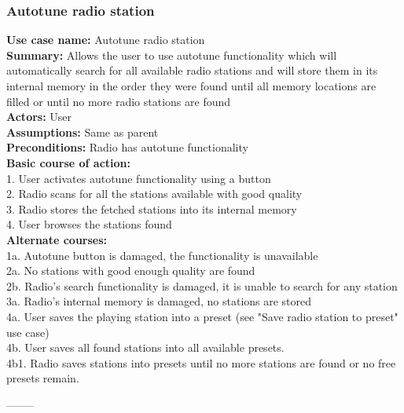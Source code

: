 \documentclass[11pt]{article}
\begin{document}
\subsubsection{Autotune radio station}
\textbf{Use case name:} Autotune radio station\\
\textbf{Summary:} Allows the user to use autotune functionality which will automatically search
for all available radio stations and will store them in its internal memory in the order they were found  until all memory locations are filled or until no more radio stations are found\\
\textbf{Actors:} User\\
\textbf{Assumptions:} Same as parent\\
\textbf{Preconditions:} Radio has autotune functionality\\
\textbf{Basic course of action:}\\
\hspace*{10mm}1. User activates autotune functionality using a button\\
\hspace*{10mm}2. Radio scans for all the stations available with good quality\\
\hspace*{10mm}3. Radio stores the fetched stations into its internal memory\\
\hspace*{10mm}4. User browses the stations found\\
\textbf{Alternate courses:}\\
\hspace*{10mm}1a. Autotune button is damaged, the functionality is unavailable\\
\hspace*{10mm}2a. No stations with good enough quality are found\\
\hspace*{10mm}2b. Radio's search functionality is damaged, it is unable to search for any station\\
\hspace*{10mm}3a. Radio's internal memory is damaged, no stations are stored\\
\hspace*{10mm}4a. User saves the playing station into a preset (see "Save radio station to preset" use case)\\
\hspace*{10mm}4b. User saves all found stations into all available presets.\\
\hspace*{20mm}4b1. Radio saves stations into presets until no more stations are found or no free presets remain.
\begin{center}--------\end{center}
\end{document}
